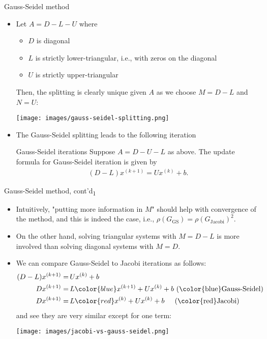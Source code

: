 \documentclass[t,usepdftitle=false]{beamer}
\begin{document}
\begin{frame}{Gauss-Seidel method}
\begin{itemize}
\item Let $A=D-L-U$ where\vspace{.1cm}
\begin{itemize}
\item $D$ is diagonal\vspace{.1cm}
\item $L$ is strictly lower-triangular, i.e., with zeros on the diagonal\vspace{.1cm}
\item $U$ is strictly upper-triangular\vspace{.1cm}
\end{itemize}
Then, the splitting is clearly unique given $A$ as we choose $M=D-L$ and $N=U$:
\begin{center}
\texttt{[image: images/gauss-seidel-splitting.png]}\vspace{.2cm}
\end{center}
\item The Gauss-Seidel splitting leads to the following iteration
\begin{block}{Gauss-Seidel iterations}
Suppose $A=D-U-L$ as above.
The update formula for Gauss-Seidel iteration is given by\vspace{-.4cm}
\begin{align*}
(D-L)x^{(k+1)}=Ux^{(k)}+b.
\end{align*}
\end{block}
\end{itemize}
\end{frame}

\begin{frame}{Gauss-Seidel method, cont'd\textsubscript{1}}
\begin{itemize}
\item Intuitively, "putting more information in $M$" should help with convergence of the method, and this is indeed the case, i.e., $\rho(G_{\mathrm{GS}})=\rho(G_{\mathrm{Jacobi}})^2$.
\item On the other hand, solving triangular systems with $M=D-L$ is more involved than solving diagonal systems with $M=D$.
\item We can compare Gauss-Seidel to Jacobi iterations as follows:
\begin{align*}
(D-L)x^{(k+1)}=&\,Ux^{(k)}+b\\
Dx^{(k+1)}=&\,L{\color{blue}x^{(k+1)}}+Ux^{(k)}+b\text{ ({\color{blue}Gauss-Seidel})}\\
Dx^{(k+1)}=&\,L{\color{red}x^{(k)}}+Ux^{(k)}+b\hspace{.39cm}\text{ ({\color{red}Jacobi})}
\end{align*}
and see they are very similar except for one term:\vspace{.025cm}
\begin{center}
\texttt{[image: images/jacobi-vs-gauss-seidel.png]}
\end{center}
\end{itemize}
\end{frame}
\end{document}
